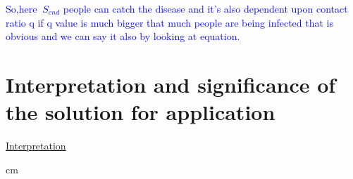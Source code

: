 \documentclass[12pt]{article}
\begin{document}
{\begin{enumerate}
\begin{tcolorbox}[enhanced,fit to height=4cm,
  colback=yellow!25!black!10!yellow,colframe=green!75!white,title=\textcolor{red}{Conclusion:3},
  drop fuzzy shadow]
  \textcolor{blue}{So,here $\ S_{end}$ people can catch the disease and it's also dependent upon contact ratio q if q value is much bigger that much people are being infected that is obvious and we can say it also by looking at equation.} 
\end{tcolorbox}




\end{enumerate}

\newpage

\section{Interpretation and significance of the solution for application}

\begin{itemize}
\bf \huge{\item \underline{ Interpretation}}
\end{itemize}
 cm


}
\end{document}
